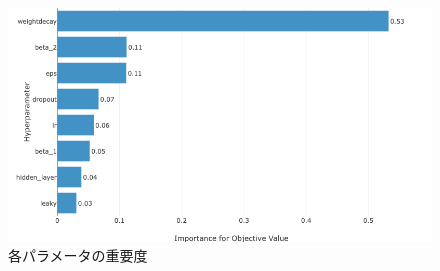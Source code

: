 \begin{figure}[H]
	\begin{center}
 \includegraphics[keepaspectratio, scale=0.3]
 	{Figure/Flavortagging/bays3.png}
 		\caption{各パラメータの重要度}
 		\label{dnnbayes3}
	\end{center}
\end{figure}


